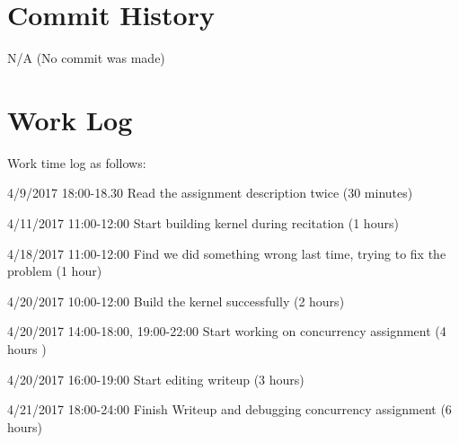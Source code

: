 \documentclass[letterpaper,10pt,titlepage]{article}
\begin{document}
\section{Commit History}

N/A (No commit was made)

\section{Work Log}

Work time log as follows: 

4/9/2017 18:00-18.30 Read the assignment description twice (30 minutes)

4/11/2017 11:00-12:00 Start building kernel during recitation (1 hours)

4/18/2017 11:00-12:00 Find we did something wrong last time, trying to fix the problem (1 hour)

4/20/2017 10:00-12:00 Build the kernel successfully (2 hours)

4/20/2017 14:00-18:00, 19:00-22:00 Start working on concurrency assignment (4 hours )

4/20/2017 16:00-19:00 Start editing writeup (3 hours)

4/21/2017 18:00-24:00 Finish Writeup and debugging concurrency assignment (6 hours)
\end{document}
